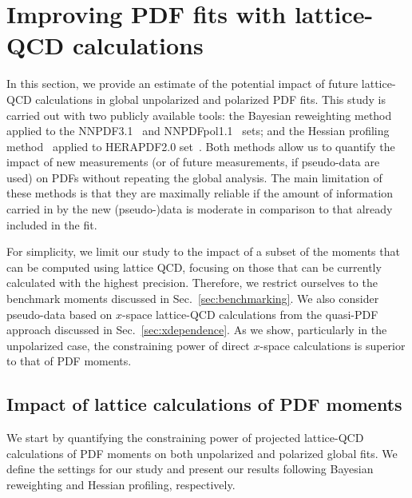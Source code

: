 \section{Improving PDF fits with lattice-QCD calculations}
\label{sec:projections}

In this section, we provide an estimate of the potential
impact of future lattice-QCD calculations
in global unpolarized and polarized PDF fits.
%
This study is carried out with two publicly available
tools: the Bayesian reweighting
method~\cite{Ball:2011gg,Ball:2010gb} applied to the
NNPDF3.1~\cite{Ball:2017nwa} and NNPDFpol1.1~\cite{Nocera:2014gqa} sets; 
and the Hessian profiling method~\cite{Camarda:2015zba} applied to
HERAPDF2.0 set~\cite{Abramowicz:2015mha}.
%
Both methods allow us to quantify the impact of new measurements
(or of future measurements, if pseudo-data are used) on PDFs without
repeating the global analysis.
%
The main limitation of these methods is that they are maximally reliable
if the amount of information carried in by the new (pseudo-)data is moderate
in comparison to that already included in the fit.

For simplicity, we limit our study to the impact of a subset of the moments 
that can be computed using lattice QCD, focusing on those that can be 
currently calculated with the highest precision.
%
Therefore, we restrict ourselves to the benchmark moments discussed in 
Sec.~\ref{sec:benchmarking}.
%
We also consider pseudo-data based on $x$-space
lattice-QCD calculations from the quasi-PDF approach
discussed in Sec.~\ref{sec:xdependence}.
%
As we show, particularly in the unpolarized case, the
constraining power of direct $x$-space calculations is
superior to that of PDF moments.

\subsection{Impact of lattice calculations of PDF moments}

We start by quantifying the constraining power of projected lattice-QCD 
calculations of PDF moments on both unpolarized and polarized global fits.
%
We define the settings for our study and present our results following
Bayesian reweighting and Hessian profiling, respectively.











